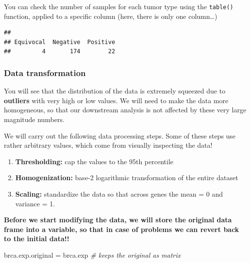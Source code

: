 \documentclass[
]{book}
\newenvironment{Shaded}{\begin{snugshade}}{\end{snugshade}}
\newcommand{\CommentTok}[1]{\textcolor[rgb]{0.56,0.35,0.01}{\textit{#1}}}
\newcommand{\FunctionTok}[1]{\textcolor[rgb]{0.13,0.29,0.53}{\textbf{#1}}}
\newcommand{\NormalTok}[1]{#1}
\newcommand{\OtherTok}[1]{\textcolor[rgb]{0.56,0.35,0.01}{#1}}
\newcommand{\SpecialCharTok}[1]{\textcolor[rgb]{0.81,0.36,0.00}{\textbf{#1}}}
\begin{document}
You can check the number of samples for each tumor type using the \texttt{table()} function, applied to a specific column (here, there is only one column\ldots)

\begin{Shaded}
\end{Shaded}

\begin{verbatim}
## 
## Equivocal  Negative  Positive 
##         4       174        22
\end{verbatim}

\hypertarget{data-transformation}{%
\subsubsection{Data transformation}\label{data-transformation}}

You will see that the distribution of the data is extremely squeezed due to \textbf{outliers} with very high or low values. We will need to make the data more homogeneous, so that our downstream analysis is not affected by these very large magnitude numbers.

We will carry out the following data processing steps. Some of these steps use rather arbitrary values, which come from visually inspecting the data!

\begin{enumerate}
\def\labelenumi{\arabic{enumi}.}
\item
  \textbf{Thresholding:} cap the values to the 95th percentile
\item
  \textbf{Homogenization:} base-2 logarithmic transformation of the entire dataset
\item
  \textbf{Scaling:} standardize the data so that across genes the mean = 0 and variance = 1.
\end{enumerate}

\textbf{Before we start modifying the data, we will store the original data frame into a variable, so that in case of problems we can revert back to the initial data!!}

\begin{Shaded}
\begin{Highlighting}[]
\NormalTok{brca.exp.original }\OtherTok{=}\NormalTok{ brca.exp }\CommentTok{\# keeps the original as matrix}
\end{Highlighting}
\end{Shaded}
\end{document}
